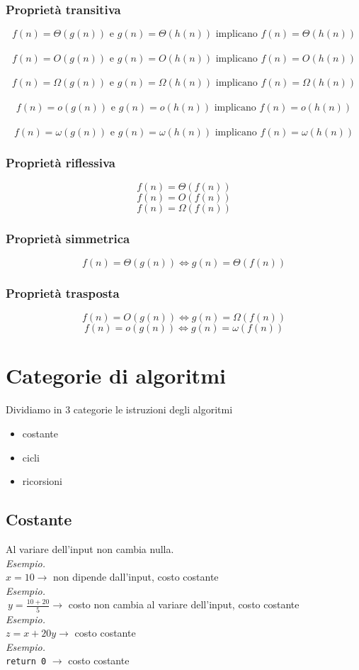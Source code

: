 \subsubsection{Proprietà transitiva}
$$f(n) = \Theta(g(n)) \text{ e } g(n)=\Theta(h(n)) \text{ implicano } f(n)=\Theta(h(n))$$\\
$$f(n) = O(g(n)) \text{ e } g(n)=O(h(n)) \text{ implicano } f(n)=O(h(n))$$\\
$$f(n) = \Omega(g(n)) \text{ e } g(n)=\Omega(h(n)) \text{ implicano } f(n)=\Omega(h(n))$$\\
$$f(n) = o(g(n)) \text{ e } g(n)=o(h(n)) \text{ implicano } f(n)=o(h(n))$$\\
$$f(n) = \omega(g(n)) \text{ e } g(n)=\omega(h(n)) \text{ implicano } f(n)=\omega(h(n))$$
\subsubsection{Proprietà riflessiva}
$$f(n)=\Theta(f(n))$$
$$f(n)=O(f(n))$$
$$f(n)=\Omega(f(n))$$
\subsubsection{Proprietà simmetrica}
$$f(n)=\Theta(g(n)) \Longleftrightarrow g(n)=\Theta(f(n))$$
\subsubsection{Proprietà trasposta}
$$f(n)=O(g(n)) \Longleftrightarrow g(n)=\Omega(f(n))$$
$$f(n)=o(g(n)) \Longleftrightarrow g(n)=\omega(f(n))$$


\section{Categorie di algoritmi}
Dividiamo in 3 categorie le istruzioni degli algoritmi
\begin{itemize}
    \item costante
    \item cicli
    \item ricorsioni
\end{itemize}

\subsection{Costante}
Al variare dell'input non cambia nulla.\smallskip\\
\textit{Esempio.}\\
$x = 10 \to $ non dipende dall'input, costo costante\\
\textit{Esempio.}\\
$\  y=\frac{10+20}{5} \to $ costo non cambia al variare dell'input, costo costante\\
\textit{Esempio.}\\
$z = x+20y \to$ costo costante\\
\textit{Esempio.}\\
\texttt{return 0} $\to $ costo costante


